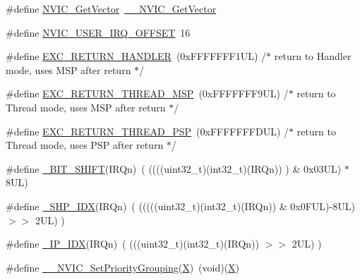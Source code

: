 \begin{DoxyCompactItemize}
\#define \hyperlink{group___c_m_s_i_s___core___n_v_i_c_functions_ga955eb1c33a3dcc62af11a8385e8c0fc8}{N\+V\+I\+C\+\_\+\+Get\+Vector}~\hyperlink{group___c_m_s_i_s___core___n_v_i_c_functions_ga44b665d2afb708121d9b10c76ff00ee5}{\+\_\+\+\_\+\+N\+V\+I\+C\+\_\+\+Get\+Vector}
\item 
\#define \hyperlink{group___c_m_s_i_s___core___n_v_i_c_functions_ga8045d905a5ca57437d8e6f71ffcb6df5}{N\+V\+I\+C\+\_\+\+U\+S\+E\+R\+\_\+\+I\+R\+Q\+\_\+\+O\+F\+F\+S\+ET}~16
\item 
\#define \hyperlink{group___c_m_s_i_s___core___n_v_i_c_functions_gaa6fa2b10f756385433e08522d9e4632f}{E\+X\+C\+\_\+\+R\+E\+T\+U\+R\+N\+\_\+\+H\+A\+N\+D\+L\+ER}~(0x\+F\+F\+F\+F\+F\+F\+F1\+U\+L)     /$\ast$ return to Handler mode, uses M\+S\+P after return                               $\ast$/
\item 
\#define \hyperlink{group___c_m_s_i_s___core___n_v_i_c_functions_gaea4703101b5e679f695e231f7ee72331}{E\+X\+C\+\_\+\+R\+E\+T\+U\+R\+N\+\_\+\+T\+H\+R\+E\+A\+D\+\_\+\+M\+SP}~(0x\+F\+F\+F\+F\+F\+F\+F9\+U\+L)     /$\ast$ return to Thread mode, uses M\+S\+P after return                                $\ast$/
\item 
\#define \hyperlink{group___c_m_s_i_s___core___n_v_i_c_functions_ga9998daf0fbdf31dbc8f81cd604b58175}{E\+X\+C\+\_\+\+R\+E\+T\+U\+R\+N\+\_\+\+T\+H\+R\+E\+A\+D\+\_\+\+P\+SP}~(0x\+F\+F\+F\+F\+F\+F\+F\+D\+U\+L)     /$\ast$ return to Thread mode, uses P\+S\+P after return                                $\ast$/
\item 
\#define \hyperlink{group___c_m_s_i_s___core___n_v_i_c_functions_ga53c75b28823441c6153269f0ecbed878}{\+\_\+\+B\+I\+T\+\_\+\+S\+H\+I\+FT}(I\+R\+Qn)~(  ((((uint32\+\_\+t)(int32\+\_\+t)(I\+R\+Qn))         )      \&  0x03\+U\+L) $\ast$ 8\+U\+L)
\item 
\#define \hyperlink{group___c_m_s_i_s___core___n_v_i_c_functions_gaee4f7eb5d7e770ad51489dbceabb1755}{\+\_\+\+S\+H\+P\+\_\+\+I\+DX}(I\+R\+Qn)~( (((((uint32\+\_\+t)(int32\+\_\+t)(I\+R\+Qn)) \& 0x0\+F\+U\+L)-\/8\+U\+L) $>$$>$    2\+U\+L)      )
\item 
\#define \hyperlink{group___c_m_s_i_s___core___n_v_i_c_functions_ga370ec4b1751a6a889d849747df3763a9}{\+\_\+\+I\+P\+\_\+\+I\+DX}(I\+R\+Qn)~(   (((uint32\+\_\+t)(int32\+\_\+t)(I\+R\+Qn))                $>$$>$    2\+U\+L)      )
\item 
\#define \hyperlink{group___c_m_s_i_s___core___n_v_i_c_functions_ga6834dd8c9c59394f1b544b57665293a4}{\+\_\+\+\_\+\+N\+V\+I\+C\+\_\+\+Set\+Priority\+Grouping}(\hyperlink{main_8c_aa6aba27bc1a89db9e350b50bbf881f57}{X})~(void)(\hyperlink{main_8c_aa6aba27bc1a89db9e350b50bbf881f57}{X})

\end{DoxyCompactItemize}

